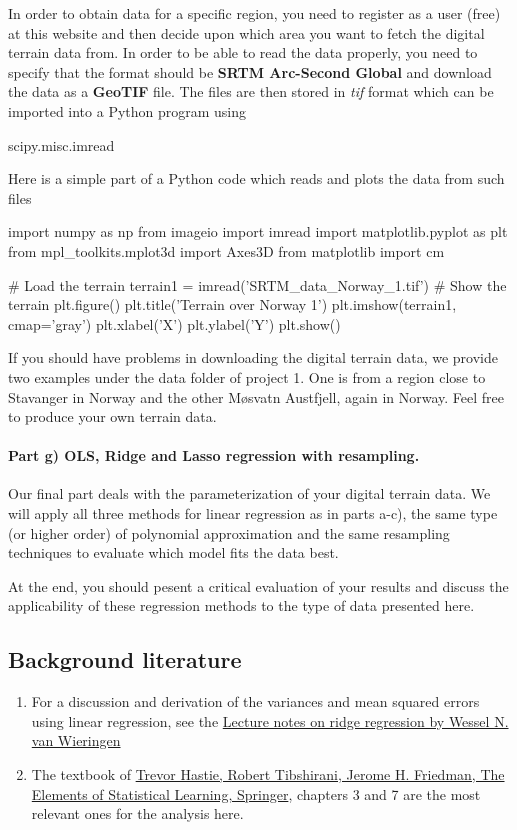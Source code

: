 \documentclass[%
oneside,                 %
final,                   %
10pt]{article}
\begin{document}
In order to obtain data for a specific region, you need to register as
a user (free) at this website and then decide upon which area you want
to fetch the digital terrain data from.  In order to be able to read
the data properly, you need to specify that the format should be \textbf{SRTM
Arc-Second Global} and download the data as a \textbf{GeoTIF} file.  The
files are then stored in \emph{tif} format which can be imported into a
Python program using

\bpycod
scipy.misc.imread
\epycod

Here is a simple part of a Python code which reads and plots the data
from such files

\bpycod
import numpy as np
from imageio import imread
import matplotlib.pyplot as plt
from mpl_toolkits.mplot3d import Axes3D
from matplotlib import cm

# Load the terrain
terrain1 = imread('SRTM_data_Norway_1.tif')
# Show the terrain
plt.figure()
plt.title('Terrain over Norway 1')
plt.imshow(terrain1, cmap='gray')
plt.xlabel('X')
plt.ylabel('Y')
plt.show()
\epycod

If you should have problems in downloading the digital terrain data,
we provide two examples under the data folder of project 1. One is
from a region close to Stavanger in Norway and the other Møsvatn
Austfjell, again in Norway.
Feel free to produce your own terrain data.

\paragraph{Part g) OLS, Ridge and Lasso regression with resampling.}
Our final part deals with the parameterization of your digital terrain
data.  We will apply all three methods for linear regression as in
parts a-c), the same type (or higher order) of polynomial
approximation and the same resampling techniques to evaluate which
model fits the data best.

At the end, you should pesent a critical evaluation of your results
and discuss the applicability of these regression methods to the type
of data presented here.




\subsection{Background literature}

\begin{enumerate}
\item For a discussion and derivation of the variances and mean squared errors using linear regression, see the \href{{https://arxiv.org/abs/1509.09169}}{Lecture notes on ridge regression by Wessel N. van Wieringen}

\item The textbook of \href{{https://www.springer.com/gp/book/9780387848570}}{Trevor Hastie, Robert Tibshirani, Jerome H. Friedman, The Elements of Statistical Learning, Springer}, chapters 3 and 7 are the most relevant ones for the analysis here. 
\end{enumerate}
\end{document}
